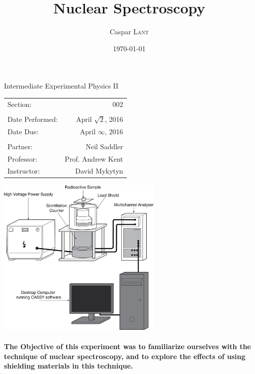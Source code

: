 \documentclass{amsart}
\title{Nuclear Spectroscopy}
\author{Caspar \textsc{Lant}} %
\date{\today} %
\begin{document}
\bigskip

\maketitle %
\begin{center}
    Intermediate Experimental Physics II\\
    \vspace{.7cm}
    \begin{tabular}{l r}
        Section: & 002\\
        \\
        Date Performed: & April $\sqrt{2}$, 2016 \\ %
        Date Due: & April $\infty$, 2016\\
        \\
        Partner: & Neil Saddler\\ %
        Professor: & Prof. Andrew Kent\\
        Instructor: & David Mykytyn %
    \end{tabular}
    \vfill
    \includegraphics[width=0.6\textwidth]{diagram.jpg}
    \vfill
\end{center}

\pagebreak
{}
\paragraph{\textbf{The Objective} of this experiment was to familiarize ourselves with the technique of nuclear spectroscopy, and to explore the effects of using shielding materials in this technique.}
\end{document}
